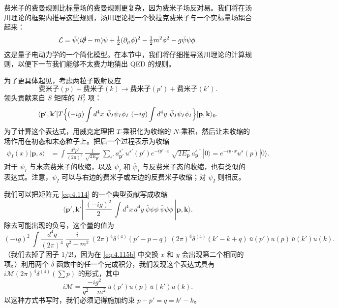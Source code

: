 费米子的费曼规则比标量场的费曼规则更复杂，因为费米子场反对易。我们将在汤川理论的框架内推导这些规则，汤川理论把一个狄拉克费米子与一个实标量场耦合起来：
\begin{equation}
  \mathcal{L} = \bar{\psi}(i\slashed{\partial} - m)\psi
    + \tfrac{1}{2}(\partial_\mu\phi)^2 - \tfrac{1}{2}m^2\phi^2
    - g\bar{\psi}\psi\phi .
  \label{eq:4.112}
\end{equation}
这是量子电动力学的一个简化模型。在本节中，我们将仔细推导汤川理论的计算规则，以便下一节我们能够不太费力地猜出 QED 的规则。

为了更具体起见，考虑两粒子散射反应
\begin{equation}
  \text{费米子}(p) + \text{费米子}(k) \to \text{费米子}(p')
    + \text{费米子}(k') .
  \label{eq:4.113}
\end{equation}
领头贡献来自 $S$ 矩阵的 $H_I^2$ 项：
\begin{equation}
  \langle \mathbf{p}',\mathbf{k}'|T\Bigl\{ (-ig)\int d^4x\
    \bar{\psi}_I\psi_I\phi_I\ (-ig)\int d^4y\
    \bar{\psi}_I\psi_I\phi_I \Bigr\}|\mathbf{p},\mathbf{k}\rangle_0 .
  \label{eq:4.114}
\end{equation}
为了计算这个表达式，用威克定理把 $T$-乘积化为收缩的 $N$-乘积，然后让未收缩的场作用在初态和末态粒子上。把后一个过程表示为收缩
\begin{equation}
  \begin{aligned}
    \psi_I(x)|\mathbf{p}, s\rangle &=
      \int \frac{d^3p'}{(2\pi)^3}\ \frac{1}{\sqrt{2E_{\mathbf{p}'}}}\
        \sum_{s'} a_{\mathbf{p}'}^{s'}\,u^{s'}(p')e^{-ip'\cdot x}\
      \sqrt{2E_{\mathbf{p}}}\,a_{\mathbf{p}}^{s\dagger}|0\rangle
    = e^{-ip\cdot x}u^s(p)|0\rangle .
  \end{aligned}
  \label{eq:4.115}
\end{equation}
对于 $\psi_I$ 与末态费米子的收缩，以及 $\psi_I$ 和 $\bar{\psi}_I$ 与反费米子态的收缩，也有类似的表达式。注意，$\psi_I$ 可以与右边的费米子或左边的反费米子收缩；对 $\bar{\psi}_I$ 则相反。

我们可以把矩阵元 \eqref{eq:4.114} 的一个典型贡献写成收缩
\begin{equation}
  \langle \mathbf{p}',\mathbf{k}'|\ \frac{(-ig)^2}{2}\
    \int d^4x\,d^4y\ \bar{\psi}\psi\phi\ \bar{\psi}\psi\phi\
    |\mathbf{p},\mathbf{k}\rangle .
  \label{eq:4.115b}
\end{equation}
除去可能出现的负号，这个量的值为
\begin{equation}
  (-ig)^2\ \int \frac{d^4q}{(2\pi)^4}\ \frac{i}{q^2-m^2}\
    (2\pi)^4\delta^{(4)}(p'-p-q)\ (2\pi)^4\delta^{(4)}(k'-k+q)
    \ \bar{u}(p')u(p)\,\bar{u}(k')u(k) .
  \label{eq:4.115c}
\end{equation}
（我们去掉了因子 $1/2!$，因为在 \eqref{eq:4.115b} 中交换 $x$ 和 $y$ 会出现第二个相同的项。）利用两个 $\delta$ 函数中的任一个完成积分，我们发现这个表达式具有 $i\mathcal{M}(2\pi)^4\delta^{(4)}(\sum p)$ 的形式，其中
\begin{equation}
  i\mathcal{M} = \frac{-ig^2}{q^2-m^2}\,
    \bar{u}(p')u(p)\,\bar{u}(k')u(k) .
  \label{eq:4.116}
\end{equation}
以这种方式书写时，我们必须记得施加约束 $p - p' = q = k' - k$。

